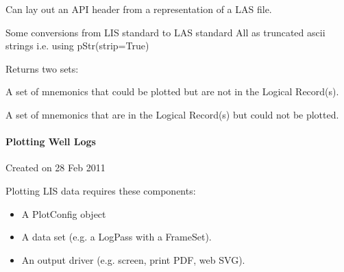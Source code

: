\documentclass[letterpaper,10pt,english]{sphinxmanual}
\begin{document}
\begin{fulllineitems}
\label{\detokenize{ref/util/plot/LogHeader:TotalDepth.util.plot.LogHeader.APIHeaderLAS}}
Can lay out an API header from a representation of a LAS file.

\begin{fulllineitems}
\label{\detokenize{ref/util/plot/LogHeader:TotalDepth.util.plot.LogHeader.APIHeaderLAS.LIS_MNEM_TO_LAS_MNEM}}
Some conversions from LIS standard to LAS standard
All as truncated ascii strings i.e. using pStr(strip=True)

\end{fulllineitems}


\begin{fulllineitems}
\label{\detokenize{ref/util/plot/LogHeader:TotalDepth.util.plot.LogHeader.APIHeaderLAS.missingFields}}
Returns two sets:

A set of mnemonics that could be plotted but are not in the Logical Record(s).

A set of mnemonics that are in the Logical Record(s) but could not be plotted.

\end{fulllineitems}


\end{fulllineitems}



\paragraph{Plotting Well Logs}
\label{\detokenize{ref/util/plot/Plot:module-TotalDepth.util.plot.Plot}}\label{\detokenize{ref/util/plot/Plot:plotting-well-logs}}\label{\detokenize{ref/util/plot/Plot::doc}}
Created on 28 Feb 2011

Plotting LIS data requires these components:
\begin{itemize}
\item {} 
A PlotConfig object

\item {} 
A data set (e.g. a LogPass with a FrameSet).

\item {} 
An output driver (e.g. screen, print PDF, web SVG).

\end{itemize}
\end{document}
